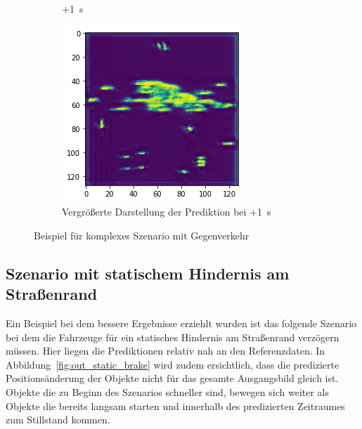 \documentclass[12pt]{article}
\begin{document}
\begin{figure}[H]
\begin{subfigure}[b]{0.18\textwidth}
                \caption{+1~s}
            \end{subfigure}
            \vspace{1cm}
            \begin{subfigure}[b]{0.6\textwidth}
                \includegraphics[width=\textwidth]{output_opposite_4.png}
                \caption{Vergrößerte Darstellung der Prediktion bei +1~s}
            \end{subfigure}
            \caption{Beispiel für komplexes Szenario mit Gegenverkehr}\label{fig:out_opposite}
        \end{figure}

    \pagebreak
    \subsection{Szenario mit statischem Hindernis am Straßenrand} 
        Ein Beispiel bei dem bessere Ergebnisse erziehlt wurden ist das folgende Szenario bei dem die Fahrzeuge 
        für ein statisches Hindernis am Straßenrand verzögern müssen. 
        Hier liegen die Prediktionen relativ nah an den Referenzdaten. 
        In Abbildung~\ref{fig:out_static_brake} wird zudem ersichtlich, dass die predizierte Positionsänderung der 
        Objekte nicht für das gesamte Ausgangsbild gleich ist. 
        Objekte die zu Beginn des Szenarios schneller sind, bewegen sich weiter als Objekte die bereits langsam starten und innerhalb des predizierten Zeitraumes zum Stillstand kommen. 
\end{document}
